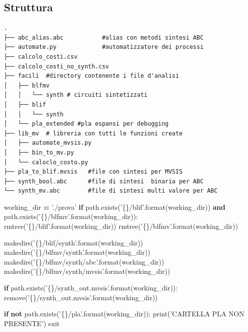 \documentclass[]{book}
\newenvironment{Shaded}{\begin{snugshade}}{\end{snugshade}}
\newcommand{\BuiltInTok}[1]{#1}
\newcommand{\ControlFlowTok}[1]{\textcolor[rgb]{0.13,0.29,0.53}{\textbf{#1}}}
\newcommand{\KeywordTok}[1]{\textcolor[rgb]{0.13,0.29,0.53}{\textbf{#1}}}
\newcommand{\NormalTok}[1]{#1}
\newcommand{\OperatorTok}[1]{\textcolor[rgb]{0.81,0.36,0.00}{\textbf{#1}}}
\newcommand{\SpecialCharTok}[1]{\textcolor[rgb]{0.00,0.00,0.00}{#1}}
\newcommand{\StringTok}[1]{\textcolor[rgb]{0.31,0.60,0.02}{#1}}
\begin{document}
\hypertarget{struttura}{%
\subsection{Struttura}\label{struttura}}

\begin{verbatim}
.
├── abc_alias.abc           #alias con metodi sintesi ABC
├── automate.py             #automatizzatore dei processi
├── calcolo_costi.csv
├── calcolo_costi_no_synth.csv
├── facili  #directory contenente i file d'analisi
│   ├── blfmv
│   │   └── synth # circuiti sintetizzati
│   ├── blif
│   │   └── synth
│   └── pla_extended #pla espansi per debugging
├── lib_mv  # libreria con tutti le funzioni create
│   ├── automate_mvsis.py
│   ├── bin_to_mv.py
│   └── caloclo_costo.py
├── pla_to_blif.mvsis   #file con sintesi per MVSIS
├── synth_bool.abc      #file di sintesi  binaria per ABC
└── synth_mv.abc        #file di sintesi multi valore per ABC
\end{verbatim}

\newpage

\begin{Shaded}
\begin{Highlighting}[]
\NormalTok{working_dir }\OperatorTok{=} \StringTok{'./prova'}
 \ControlFlowTok{if}\NormalTok{ path.exists(}\StringTok{'}\SpecialCharTok{\{\}}\StringTok{/blif'}\NormalTok{.}\BuiltInTok{format}\NormalTok{(working_dir)) }
    \KeywordTok{and}\NormalTok{ path.exists(}\StringTok{'}\SpecialCharTok{\{\}}\StringTok{/blfmv'}\NormalTok{.}\BuiltInTok{format}\NormalTok{(working_dir)):}
\NormalTok{        rmtree(}\StringTok{'}\SpecialCharTok{\{\}}\StringTok{/blif'}\NormalTok{.}\BuiltInTok{format}\NormalTok{(working_dir))}
\NormalTok{        rmtree(}\StringTok{'}\SpecialCharTok{\{\}}\StringTok{/blfmv'}\NormalTok{.}\BuiltInTok{format}\NormalTok{(working_dir))}
      
\NormalTok{makedirs(}\StringTok{'}\SpecialCharTok{\{\}}\StringTok{/blif/synth'}\NormalTok{.}\BuiltInTok{format}\NormalTok{(working_dir))}
\NormalTok{makedirs(}\StringTok{'}\SpecialCharTok{\{\}}\StringTok{/blfmv/synth'}\NormalTok{.}\BuiltInTok{format}\NormalTok{(working_dir))}
\NormalTok{makedirs(}\StringTok{'}\SpecialCharTok{\{\}}\StringTok{/blfmv/synth/abc'}\NormalTok{.}\BuiltInTok{format}\NormalTok{(working_dir))}
\NormalTok{makedirs(}\StringTok{'}\SpecialCharTok{\{\}}\StringTok{/blfmv/synth/mvsis'}\NormalTok{.}\BuiltInTok{format}\NormalTok{(working_dir))}

\ControlFlowTok{if}\NormalTok{ path.exists(}\StringTok{'}\SpecialCharTok{\{\}}\StringTok{/synth_out.mvsis'}\NormalTok{.}\BuiltInTok{format}\NormalTok{(working_dir)):}
\NormalTok{    remove(}\StringTok{'}\SpecialCharTok{\{\}}\StringTok{/synth_out.mvsis'}\NormalTok{.}\BuiltInTok{format}\NormalTok{(working_dir))}

\ControlFlowTok{if} \KeywordTok{not}\NormalTok{ path.exists(}\StringTok{'}\SpecialCharTok{\{\}}\StringTok{/pla'}\NormalTok{.}\BuiltInTok{format}\NormalTok{(working_dir)):}
    \BuiltInTok{print}\NormalTok{(}\StringTok{'CARTELLA PLA NON PRESENTE'}\NormalTok{)}
\NormalTok{    exit}
\end{Highlighting}
\end{Shaded}
\end{document}
